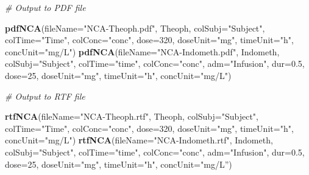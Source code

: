 \documentclass[]{krantz}
\makeatletter
\newenvironment{Shaded}{\begin{snugshade}}{\end{snugshade}}
\newcommand{\KeywordTok}[1]{\textcolor[rgb]{0.13,0.29,0.53}{\textbf{#1}}}
\newcommand{\DataTypeTok}[1]{\textcolor[rgb]{0.13,0.29,0.53}{#1}}
\newcommand{\DecValTok}[1]{\textcolor[rgb]{0.00,0.00,0.81}{#1}}
\newcommand{\FloatTok}[1]{\textcolor[rgb]{0.00,0.00,0.81}{#1}}
\newcommand{\StringTok}[1]{\textcolor[rgb]{0.31,0.60,0.02}{#1}}
\newcommand{\CommentTok}[1]{\textcolor[rgb]{0.56,0.35,0.01}{\textit{#1}}}
\newcommand{\NormalTok}[1]{#1}
\newenvironment{kframe}{%
\medskip{}
\setlength{\fboxsep}{.8em}
 \def\at@end@of@kframe{}%
 \ifinner\ifhmode%
  \def\at@end@of@kframe{\end{minipage}}%
  \begin{minipage}{\columnwidth}%
 \fi\fi%
 \def\FrameCommand##1{\hskip\@totalleftmargin \hskip-\fboxsep
 \colorbox{shadecolor}{##1}\hskip-\fboxsep
     \hskip-\linewidth \hskip-\@totalleftmargin \hskip\columnwidth}%
 \MakeFramed {\advance\hsize-\width
   \@totalleftmargin\z@ \linewidth\hsize
   \@setminipage}}%
 {\par\unskip\endMakeFramed%
 \at@end@of@kframe}
\renewenvironment{Shaded}{\begin{kframe}}{\end{kframe}}
\theoremstyle{definition}
\theoremstyle{definition}
\theoremstyle{definition}
\theoremstyle{remark}
\makeatother
\begin{document}
\begin{Shaded}
\begin{Highlighting}[]
\CommentTok{# Output to PDF file}

\KeywordTok{pdfNCA}\NormalTok{(}\DataTypeTok{fileName=}\StringTok{"NCA-Theoph.pdf"}\NormalTok{, Theoph, }\DataTypeTok{colSubj=}\StringTok{"Subject"}\NormalTok{, }\DataTypeTok{colTime=}\StringTok{"Time"}\NormalTok{, }
       \DataTypeTok{colConc=}\StringTok{"conc"}\NormalTok{, }\DataTypeTok{dose=}\DecValTok{320}\NormalTok{, }\DataTypeTok{doseUnit=}\StringTok{"mg"}\NormalTok{, }\DataTypeTok{timeUnit=}\StringTok{"h"}\NormalTok{, }\DataTypeTok{concUnit=}\StringTok{"mg/L"}\NormalTok{)}
\KeywordTok{pdfNCA}\NormalTok{(}\DataTypeTok{fileName=}\StringTok{"NCA-Indometh.pdf"}\NormalTok{, Indometh, }\DataTypeTok{colSubj=}\StringTok{"Subject"}\NormalTok{, }\DataTypeTok{colTime=}\StringTok{"time"}\NormalTok{, }
       \DataTypeTok{colConc=}\StringTok{"conc"}\NormalTok{, }\DataTypeTok{adm=}\StringTok{"Infusion"}\NormalTok{, }\DataTypeTok{dur=}\FloatTok{0.5}\NormalTok{, }\DataTypeTok{dose=}\DecValTok{25}\NormalTok{, }\DataTypeTok{doseUnit=}\StringTok{"mg"}\NormalTok{, }
       \DataTypeTok{timeUnit=}\StringTok{"h"}\NormalTok{, }\DataTypeTok{concUnit=}\StringTok{"mg/L"}\NormalTok{)}

\CommentTok{# Output to RTF file}

\KeywordTok{rtfNCA}\NormalTok{(}\DataTypeTok{fileName=}\StringTok{"NCA-Theoph.rtf"}\NormalTok{, Theoph, }\DataTypeTok{colSubj=}\StringTok{"Subject"}\NormalTok{, }\DataTypeTok{colTime=}\StringTok{"Time"}\NormalTok{, }
       \DataTypeTok{colConc=}\StringTok{"conc"}\NormalTok{, }\DataTypeTok{dose=}\DecValTok{320}\NormalTok{, }\DataTypeTok{doseUnit=}\StringTok{"mg"}\NormalTok{, }\DataTypeTok{timeUnit=}\StringTok{"h"}\NormalTok{, }\DataTypeTok{concUnit=}\StringTok{"mg/L"}\NormalTok{)}
\KeywordTok{rtfNCA}\NormalTok{(}\DataTypeTok{fileName=}\StringTok{"NCA-Indometh.rtf"}\NormalTok{, Indometh, }\DataTypeTok{colSubj=}\StringTok{"Subject"}\NormalTok{, }\DataTypeTok{colTime=}\StringTok{"time"}\NormalTok{, }
       \DataTypeTok{colConc=}\StringTok{"conc"}\NormalTok{, }\DataTypeTok{adm=}\StringTok{"Infusion"}\NormalTok{, }\DataTypeTok{dur=}\FloatTok{0.5}\NormalTok{, }\DataTypeTok{dose=}\DecValTok{25}\NormalTok{, }\DataTypeTok{doseUnit=}\StringTok{"mg"}\NormalTok{, }
       \DataTypeTok{timeUnit=}\StringTok{"h"}\NormalTok{, }\DataTypeTok{concUnit=}\StringTok{"mg/L”)}
\end{Highlighting}
\end{Shaded}
\end{document}
